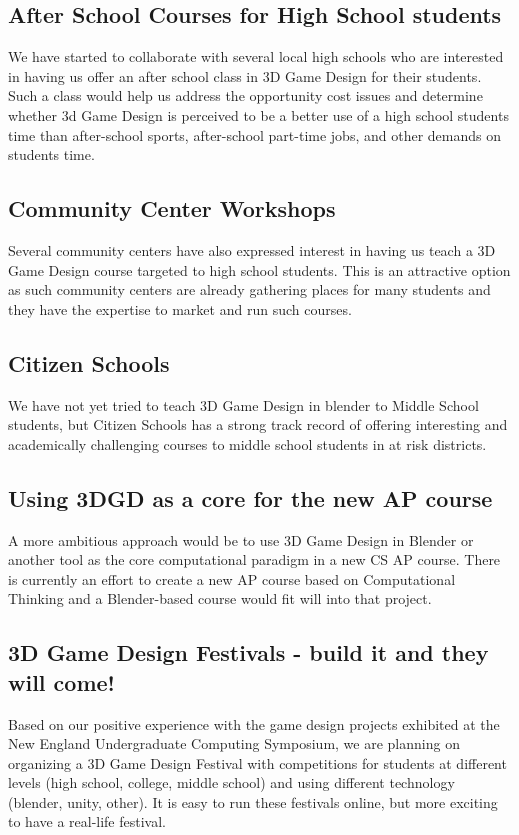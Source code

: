 \documentclass{sig-alternate}
\begin{document}
\subsection{After School Courses for High School students}
We have started to collaborate with several local high schools who are interested in having us offer
an after school class in 3D Game Design for their students.  Such a class would help us address the opportunity cost issues and determine whether 3d Game Design is perceived to be a better use of a high school students time than after-school sports, after-school part-time jobs, and other demands on students time.

\subsection{Community Center Workshops}
Several community centers have also expressed interest in having us teach a 3D Game Design course
targeted to high school students. This is an attractive option as such community centers are already
gathering places for many students and they have the expertise to market and run such courses.

\subsection{Citizen Schools}
We have not yet tried to teach 3D Game Design in blender to Middle School students, but 
Citizen Schools has a strong track record of offering interesting and academically challenging
courses to middle school students in at risk districts.

\subsection{Using 3DGD as a core for the new AP course}
A more ambitious approach would be to use 3D Game Design in Blender or another tool as the
core computational paradigm in a new CS AP course. There is currently an effort to create a new
AP course based on Computational Thinking and a Blender-based course would fit will into that
project.

\subsection{3D Game Design Festivals - build it and they will come!}
Based on our positive experience with the game design projects exhibited at the 
New England Undergraduate Computing Symposium, we are planning on organizing a
3D Game Design Festival with competitions for students at different levels (high school, college,
middle school) and using different technology (blender, unity, other). It is easy to run these
festivals online, but more exciting to have a real-life festival.
\end{document}
